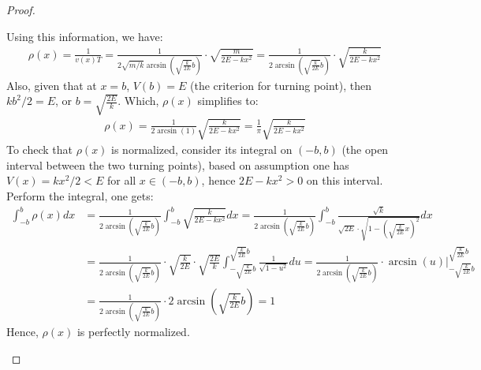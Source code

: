 \documentclass{article}
\begin{document}
\begin{proof}
\begin{itemize}
        Using this information, we have: 
        \begin{align}
            \rho(x)=\frac{1}{v(x)T} = \frac{1}{2\sqrt{m/k}\arcsin\left(\sqrt{\frac{k}{2E}}b\right)}\cdot\sqrt{\frac{m}{2E-kx^2}} = \frac{1}{2\arcsin\left(\sqrt{\frac{k}{2E}}b\right)}\cdot\sqrt{\frac{k}{2E-kx^2}}
        \end{align}
        Also, given that at $x=b$, $V(b)=E$ (the criterion for turning point), then $kb^2/2=E$, or $b=\sqrt{\frac{2E}{k}}$. Which, $\rho(x)$ simplifies to:
        \begin{align}
            \rho(x)=\frac{1}{2\arcsin(1)}\sqrt{\frac{k}{2E-kx^2}}=\frac{1}{\pi}\sqrt{\frac{k}{2E-kx^2}}
        \end{align}
        To check that $\rho(x)$ is normalized, consider its integral on $(-b,b)$ (the open interval between the two turning points), based on assumption one has $V(x)=kx^2/2< E$ for all $x \in (-b,b)$, hence  $2E-kx^2> 0$ on this interval. Perform the integral, one gets:
        \begin{align}
            \int_{-b}^{b}\rho(x)dx &= \frac{1}{2\arcsin\left(\sqrt{\frac{k}{2E}}b\right)}\int_{-b}^{b}\sqrt{\frac{k}{2E-kx^2}}dx=\frac{1}{2\arcsin\left(\sqrt{\frac{k}{2E}}b\right)}\int_{-b}^{b}\frac{\sqrt{k}}{\sqrt{2E}\cdot\sqrt{1-\left(\sqrt{\frac{k}{2E}}x\right)^2}}dx\\
            &= \frac{1}{2\arcsin\left(\sqrt{\frac{k}{2E}}b\right)}\cdot\sqrt{\frac{k}{2E}}\cdot \sqrt{\frac{2E}{k}}\int_{-\sqrt{\frac{k}{2E}}b}^{\sqrt{\frac{k}{2E}}b}\frac{1}{\sqrt{1-u^2}}du = \frac{1}{2\arcsin\left(\sqrt{\frac{k}{2E}}b\right)}\cdot\arcsin(u)\bigg|_{-\sqrt{\frac{k}{2E}}b}^{\sqrt{\frac{k}{2E}}b}\\
            &= \frac{1}{2\arcsin\left(\sqrt{\frac{k}{2E}}b\right)}\cdot 2\arcsin\left(\sqrt{\frac{k}{2E}}b\right)=1
        \end{align}
        Hence, $\rho(x)$ is perfectly normalized.


\end{itemize}
\end{proof}
\end{document}
